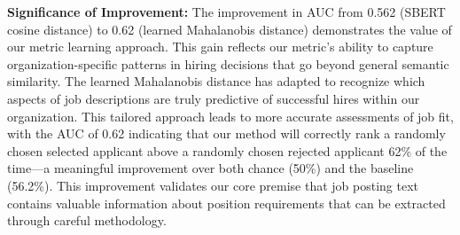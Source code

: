 \textbf{Significance of Improvement:} The improvement in AUC from 0.562 (SBERT cosine distance) to 0.62 
(learned Mahalanobis distance) demonstrates the value of our metric learning approach. This gain reflects 
our metric's ability to capture organization-specific patterns in hiring decisions that go beyond general 
semantic similarity. The learned Mahalanobis distance has adapted to recognize which aspects of 
job descriptions are truly predictive of successful hires within our organization. This tailored approach 
leads to more accurate assessments of job fit, with the AUC of 0.62 indicating that our method will 
correctly rank a randomly chosen selected applicant above a randomly chosen rejected applicant 
62\% of the time—a meaningful improvement over both chance (50\%) and the baseline (56.2\%). 
This improvement validates our core premise that job posting text contains valuable information 
about position requirements that can be extracted through careful methodology.
